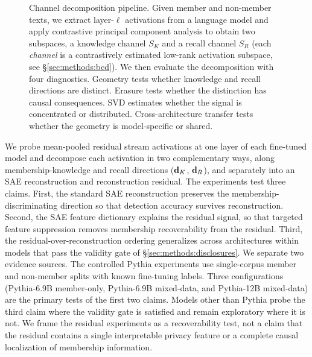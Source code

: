 \begin{figure}[t]
{%
}
\caption{
Channel decomposition pipeline. Given member and non-member texts,
we extract layer-$\ell$ activations from a language model and apply contrastive
principal component analysis to obtain two subspaces, a knowledge channel $S_K$ and a recall
channel $S_R$ (each \emph{channel} is a contrastively estimated low-rank activation subspace, see \S\ref{sec:methods:bcd}). We then evaluate the decomposition with four diagnostics.
Geometry tests whether knowledge and recall directions are distinct. Erasure
tests whether the distinction has causal consequences. SVD estimates whether
the signal is concentrated or distributed. Cross-architecture transfer tests
whether the geometry is model-specific or shared.
}
\label{fig:behavioral-channel-decomposition}
\end{figure}

We probe mean-pooled residual stream activations at one layer of each fine-tuned model and decompose each activation in two complementary ways, along membership-knowledge and recall directions ($\mathbf{d}_K$, $\mathbf{d}_R$), and separately into an SAE reconstruction and reconstruction residual. The experiments test three claims. First, the standard SAE reconstruction preserves the membership-discriminating direction so that detection accuracy survives reconstruction. Second, the SAE feature dictionary explains the residual signal, so that targeted feature suppression removes membership recoverability from the residual. Third, the residual-over-reconstruction ordering generalizes across architectures within models that pass the validity gate of \S\ref{sec:methods:disclosures}. We separate two evidence sources. The controlled Pythia experiments use single-corpus member and non-member splits with known fine-tuning labels. Three configurations (Pythia-6.9B member-only, Pythia-6.9B mixed-data, and Pythia-12B mixed-data) are the primary tests of the first two claims. Models other than Pythia probe the third claim where the validity gate is satisfied and remain exploratory where it is not. We frame the residual experiments as a recoverability test, not a claim that the residual contains a single interpretable privacy feature or a complete causal localization of membership information.

